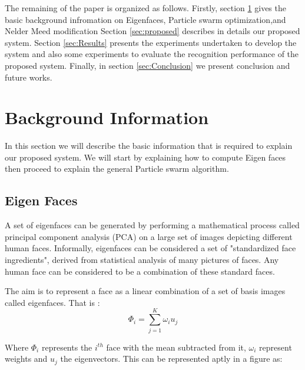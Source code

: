 \documentclass[a4paper,twoside]{article}
\begin{document}
The remaining of the paper is organized as follows. Firstly, section
\ref{sec:section2} gives the basic background infromation on  Eigenfaces,
Particle swarm optimization,and Nelder Meed modification Section
\ref{sec:proposed} describes in details our proposed system. Section \ref{sec:Results} presents the experiments undertaken to develop the system and also some experiments to evaluate the recognition performance of the proposed system. Finally, in section \ref{sec:Conclusion} we present conclusion and future works.



\section{Background Information}
\label{sec:section2}
In this section we will describe the basic information that is required to
explain our proposed system.  We will start by explaining how to compute Eigen
faces then proceed to explain the general Particle swarm algorithm.

\subsection{Eigen Faces}
\label{facereg}
A set of eigenfaces \cite{facesite} can be generated by performing a mathematical process called principal component analysis (PCA) on a large set of images depicting different human faces. Informally, eigenfaces can be considered a set of "standardized face ingredients", derived from statistical analysis of many pictures of faces. Any human face can be considered to be a combination of these standard faces.


 The aim is to represent a face as a linear combination of a set of basis images called eigenfaces. That is :
\begin{equation}
\Phi _i  = \sum\limits_{j = 1}^K {\omega _i u_j }
\end{equation}

Where $\Phi_i$ represents the $i^{th}$ face with the mean subtracted from it, $\omega _i$ represent weights and  $u_j$ the eigenvectors.
This can be represented aptly in a figure as:
\end{document}
